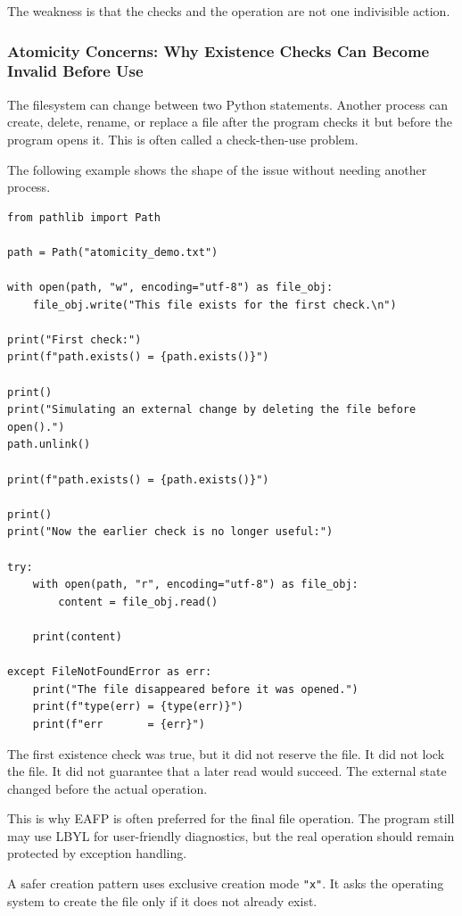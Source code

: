 The weakness is that the checks and the operation are not one indivisible action.

\subsubsection{Atomicity Concerns: Why Existence Checks Can Become Invalid Before Use}

The filesystem can change between two Python statements. Another process can create, delete, rename, or replace a file after the program checks it but before the program opens it. This is often called a check-then-use problem.

The following example shows the shape of the issue without needing another process.

\begin{verbatim}
from pathlib import Path

path = Path("atomicity_demo.txt")

with open(path, "w", encoding="utf-8") as file_obj:
    file_obj.write("This file exists for the first check.\n")

print("First check:")
print(f"path.exists() = {path.exists()}")

print()
print("Simulating an external change by deleting the file before open().")
path.unlink()

print(f"path.exists() = {path.exists()}")

print()
print("Now the earlier check is no longer useful:")

try:
    with open(path, "r", encoding="utf-8") as file_obj:
        content = file_obj.read()

    print(content)

except FileNotFoundError as err:
    print("The file disappeared before it was opened.")
    print(f"type(err) = {type(err)}")
    print(f"err       = {err}")
\end{verbatim}

The first existence check was true, but it did not reserve the file. It did not lock the file. It did not guarantee that a later read would succeed. The external state changed before the actual operation.

This is why EAFP is often preferred for the final file operation. The program still may use LBYL for user-friendly diagnostics, but the real operation should remain protected by exception handling.

A safer creation pattern uses exclusive creation mode \texttt{"x"}. It asks the operating system to create the file only if it does not already exist.

